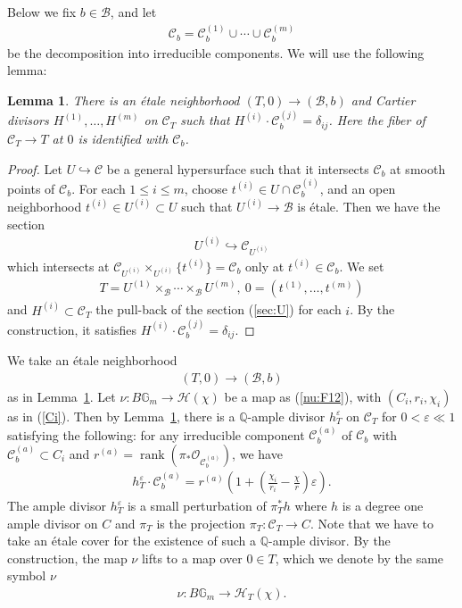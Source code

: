 \documentclass[11pt,oneside,a4paper,mathscr]{amsart}
\newtheorem{lemma}[thm]{Lemma}
\theoremstyle{definition}
\renewcommand{\leq}{\leqslant}
\newcommand{\cH}{\mathcal{H}}
\newcommand{\cB}{\mathcal{B}}
\newcommand{\cC}{\mathcal{C}}
\newcommand{\cO}{\mathcal{O}}
\newcommand{\bgm}{B\mathbb{G}_m}
\begin{document}
Below we fix $b\in \cB$, and let 
\begin{align*}
    \cC_b=\cC_b^{(1)}\cup \cdots \cup \cC_b^{(m)}
\end{align*}
be the decomposition into irreducible components. 
We will use the following lemma: 
\begin{lemma}\label{lem:etale}
There is an \'etale neighborhood $(T, 0) \to (\cB, b)$
and Cartier divisors $H^{(1)}, \ldots, H^{(m)}$
on $\cC_T$ such that $H^{(i)} \cdot \cC_b^{(j)}=\delta_{ij}$.
Here the fiber of $\cC_T \to T$ at $0$ is identified with $\cC_b$. 
\end{lemma}
\begin{proof}
Let $U\hookrightarrow \cC$ be a general hypersurface such that 
it intersects $\cC_b$ at smooth points of $\cC_b$. 
For each $1\leq i\leq m$, choose $t^{(i)} \in U\cap \cC_b^{(i)}$, 
and an open neighborhood $t^{(i)} \in U^{(i)} \subset U$ such that 
$U^{(i)} \to \cB$ is \'etale. 
Then we have the section 
\begin{align}\label{sec:U}
    U^{(i)}\hookrightarrow \cC_{U^{(i)}}
\end{align}
which intersects at $\cC_{U^{(i)}}\times_{U^{(i)}}\{t^{(i)}\}=\cC_b$
only at $t^{(i)} \in \cC_b$. 
We set 
\begin{align*}
    T=U^{(1)}\times_{\cB} \cdots \times_{\cB}U^{(m)}, \ 0=(t^{(1)}, \ldots, t^{(m)})
\end{align*}
and $H^{(i)} \subset \cC_T$ the pull-back of the section (\ref{sec:U}) for each $i$. By the construction, it satisfies $H^{(i)} \cdot \cC_b^{(j)}=\delta_{ij}$. 
\end{proof}


We take an \'{e}tale neighborhood 
\begin{align*}(T, 0) \to (\cB, b)\end{align*} 
as in Lemma~\ref{lem:etale}.
Let $\nu \colon \bgm \to \cH(\chi)$ be
a map as (\ref{nu:F12}), 
with $(C_i, r_i, \chi_i)$ as in (\ref{Ci}). 
Then by Lemma~\ref{lem:etale}, there is 
a $\mathbb{Q}$-ample divisor $h_T^{\varepsilon}$ 
on $\cC_T$ 
for $0<\varepsilon \ll 1$ satisfying 
the following: for any irreducible component $\cC_b^{(a)}$ of $\cC_b$
with $\cC_b^{(a)} \subset C_i$ 
and $r^{(a)}=\operatorname{rank}(\pi_{*}\cO_{\cC_b^{(a)}})$, 
we have 
\begin{align}\label{div:hT}
    h_T^{\varepsilon} \cdot \cC_b^{(a)}=r^{(a)}\left(1+ \left(\frac{\chi_i}{r_i}-\frac{\chi}{r}\right)\varepsilon \right). 
\end{align}
The ample divisor $h_T^{\varepsilon}$ is a small perturbation of $\pi_T^* h$ where $h$ is a degree 
one ample divisor on $C$ and $\pi_T$ is the projection 
$\pi_T \colon \cC_T \to C$. Note that we have to take an \'{e}tale cover for the existence of 
such a $\mathbb{Q}$-ample divisor. 
By the construction, the map $\nu$ lifts to a map over $0\in T$, which 
we denote by the same symbol $\nu$
\begin{align*}
    \nu \colon \bgm \to \cH_T(\chi).
\end{align*}
\end{document}
